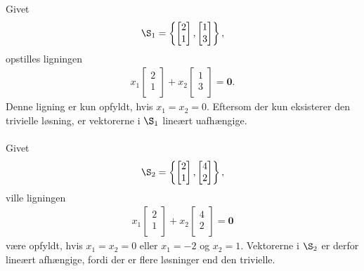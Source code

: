 \begin{eks}\label{fisk}
Givet
\begin{align*}
\S_1 =
\left\{ 
\begin{bmatrix}
           2 \\
           1 \\
\end{bmatrix} 
,
\begin{bmatrix}
           1 \\
           3 \\
\end{bmatrix}
\right\},
\end{align*}
opstilles ligningen  
%
\begin{align*}
x_1 
\begin{bmatrix}
           2 \\
           1 \\
\end{bmatrix} 
+ x_2
\begin{bmatrix}
           1 \\
           3 \\
\end{bmatrix}
= \mathbf{0}.
\end{align*}
%
Denne ligning er kun opfyldt, hvis $x_1=x_2=0$. 
Eftersom der kun eksisterer den trivielle løsning, er vektorerne i $\S_1$ lineært uafhængige.
\\\\
Givet
\begin{align*}
\S_2 =
\left\{ 
\begin{bmatrix}
           2 \\
           1 \\
\end{bmatrix} 
,
\begin{bmatrix}
           4 \\
           2 \\
\end{bmatrix}
\right\},
\end{align*}
%
ville ligningen 
%
\begin{align*}
x_1 
\begin{bmatrix}
           2 \\
           1 \\
\end{bmatrix} 
+ x_2
\begin{bmatrix}
           4 \\
           2 \\
\end{bmatrix}
= \mathbf{0}
\end{align*}
%
%
være opfyldt, hvis $x_1=x_2=0$ eller $x_1=-2$ og $x_2=1$. 
Vektorerne i $\S_2$ er derfor lineært afhængige, fordi der er flere løsninger end den trivielle.
%
\end{eks}
